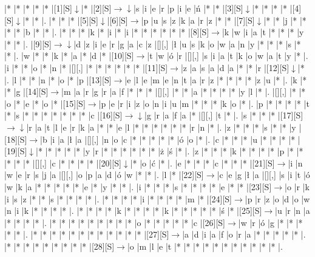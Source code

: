 \documentclass[11pt]{article}
\newcommand\drarr{$\rightarrow \!\!\!\!\! \downarrow$}
\newcommand\rarr{$\rightarrow$}
\newcommand\darr{$\downarrow$}
\begin{document}
\noindent\begin{Puzzle}{25}{21}|*	|*	|*	|*	|*	|[1][S]\darr	|*	|[2][S]\drarr	|s	|i	|e	|r	|p	|i	|e	|ń	|*	|*	|[3][S]\darr	|*	|*	|*	|*	|[4][S]\darr	|*	|*	|.
|*	|*	|*	|[5][S]\darr	|[6][S]\rarr	|p	|u	|s	|z	|k	|a	|r	|z	|*	|*	|[7][S]\darr	|*	|*	|j	|*	|*	|*	|*	|b	|*	|*	|.
|*	|*	|*	|k	|*	|i	|*	|i	|*	|*	|*	|*	|*	|*	|[8][S]\rarr	|k	|w	|i	|a	|t	|*	|*	|*	|y	|*	|*	|.
|[9][S]\drarr	|d	|z	|i	|e	|r	|g	|a	|c	|z	|[][,]{ }	|ł	|u	|s	|k	|o	|w	|a	|n	|y	|*	|*	|*	|s	|*	|*	|.
|w	|*	|*	|k	|*	|a	|*	|d	|*	|[10][S]\rarr	|t	|w	|ó	|r	|[][,]{ }	|s	|i	|a	|t	|k	|o	|w	|a	|t	|y	|*	|.
|i	|*	|*	|o	|*	|n	|*	|[][,]{ }	|*	|*	|*	|*	|*	|*	|[11][S]\rarr	|z	|a	|s	|a	|d	|a	|*	|*	|r	|[12][S]\darr	|*	|.
|l	|*	|*	|n	|*	|o	|*	|p	|[13][S]\rarr	|e	|l	|e	|m	|e	|n	|t	|a	|r	|z	|*	|*	|*	|*	|z	|u	|*	|.
|k	|*	|*	|g	|[14][S]\rarr	|m	|a	|r	|g	|r	|a	|f	|*	|*	|*	|[][,]{ }	|*	|*	|a	|*	|*	|*	|*	|y	|l	|*	|.
|[][,]{ }	|*	|*	|o	|*	|e	|*	|o	|*	|[15][S]\rarr	|p	|e	|r	|i	|z	|o	|n	|i	|u	|m	|*	|*	|*	|k	|o	|*	|.
|p	|*	|*	|*	|*	|t	|*	|s	|*	|*	|*	|*	|*	|*	|*	|c	|[16][S]\drarr	|g	|r	|a	|f	|a	|*	|[][,]{ }	|t	|*	|.
|s	|*	|*	|*	|[17][S]\drarr	|r	|a	|t	|l	|e	|r	|k	|a	|*	|*	|e	|l	|*	|*	|*	|*	|*	|*	|r	|n	|*	|.
|z	|*	|*	|*	|s	|*	|*	|y	|[18][S]\rarr	|b	|i	|a	|ł	|a	|[][,]{ }	|n	|o	|c	|*	|*	|*	|*	|*	|ó	|o	|*	|.
|c	|*	|*	|*	|u	|*	|*	|*	|*	|[19][S]\darr	|*	|*	|*	|*	|*	|y	|r	|*	|*	|*	|*	|*	|*	|ż	|ś	|*	|.
|z	|*	|*	|*	|k	|*	|*	|*	|*	|p	|*	|*	|*	|*	|*	|[][,]{ }	|c	|*	|*	|*	|*	|[20][S]\darr	|*	|o	|ć	|*	|.
|e	|*	|*	|*	|c	|*	|*	|*	|[21][S]\rarr	|i	|n	|w	|e	|r	|s	|j	|a	|[][,]{ }	|o	|p	|a	|d	|ó	|w	|*	|*	|.
|l	|*	|[22][S]\rarr	|c	|e	|g	|ł	|a	|[][,]{ }	|s	|i	|t	|ó	|w	|k	|a	|*	|*	|*	|*	|*	|e	|*	|y	|*	|*	|.
|i	|*	|*	|*	|s	|*	|*	|*	|*	|e	|*	|*	|[23][S]\rarr	|o	|r	|k	|i	|s	|z	|*	|*	|s	|*	|*	|*	|*	|.
|*	|*	|*	|*	|i	|*	|*	|*	|*	|m	|*	|[24][S]\rarr	|p	|r	|z	|o	|d	|o	|w	|n	|i	|k	|*	|*	|*	|*	|.
|*	|*	|*	|*	|k	|*	|*	|*	|*	|k	|*	|*	|*	|*	|*	|ś	|*	|[25][S]\rarr	|u	|r	|n	|a	|*	|*	|*	|*	|.
|*	|*	|*	|*	|*	|*	|*	|*	|*	|o	|*	|*	|*	|*	|*	|c	|[26][S]\rarr	|w	|r	|ó	|g	|*	|*	|*	|*	|*	|.
|*	|*	|*	|*	|*	|*	|*	|*	|*	|*	|*	|*	|[27][S]\rarr	|a	|d	|i	|a	|f	|o	|r	|a	|*	|*	|*	|*	|*	|.
|*	|*	|*	|*	|*	|*	|*	|*	|*	|[28][S]\rarr	|o	|m	|l	|e	|t	|*	|*	|*	|*	|*	|*	|*	|*	|*	|*	|*	|.\end{Puzzle}

\newpage
\end{document}
